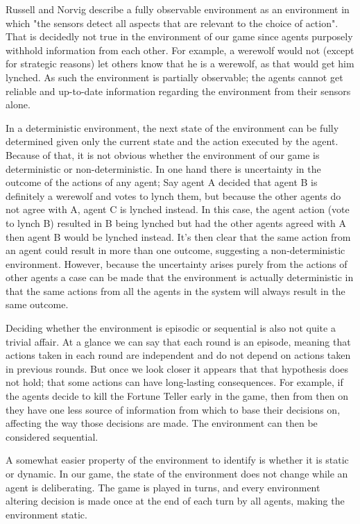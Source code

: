 \documentclass{article}
\begin{document}
Russell and Norvig describe a fully observable environment as an environment in which "the sensors detect all aspects that are relevant to the choice of action". That is decidedly not true in the environment of our game since agents purposely withhold information from each other. For example, a werewolf would not (except for strategic reasons) let others know that he is a werewolf, as that would get him lynched. As such the environment is partially observable; the agents cannot get reliable and up-to-date information regarding the environment from their sensors alone.

In a deterministic environment, the next state of the environment can be fully determined given only the current state and the action executed by the agent. Because of that, it is not obvious whether the environment of our game is deterministic or non-deterministic. In one hand there is uncertainty in the outcome of the actions of any agent; Say agent A decided that agent B is definitely a werewolf and votes to lynch them, but because the other agents do not agree with A, agent C is lynched instead. In this case, the agent action (vote to lynch B) resulted in B being lynched but had the other agents agreed with A then agent B would be lynched instead. It's then clear that the same action from an agent could result in more than one outcome, suggesting a non-deterministic environment. However, because the uncertainty arises purely from the actions of other agents a case can be made that the environment is actually deterministic in that the same actions from all the agents in the system will always result in the same outcome.

Deciding whether the environment is episodic or sequential is also not quite a trivial affair. At a glance we can say that each round is an episode, meaning that actions taken in each round are independent and do not depend on actions taken in previous rounds. But once we look closer it appears that that hypothesis does not hold; that some actions can have long-lasting consequences. For example, if the agents decide to kill the Fortune Teller early in the game, then from then on they have one less source of information from which to base their decisions on, affecting the way those decisions are made. The environment can then be considered sequential.

A somewhat easier property of the environment to identify is whether it is static or dynamic. In our game, the state of the environment does not change while an agent is deliberating. The game is played in turns, and every environment altering decision is made once at the end of each turn by all agents, making the environment static.
\end{document}
